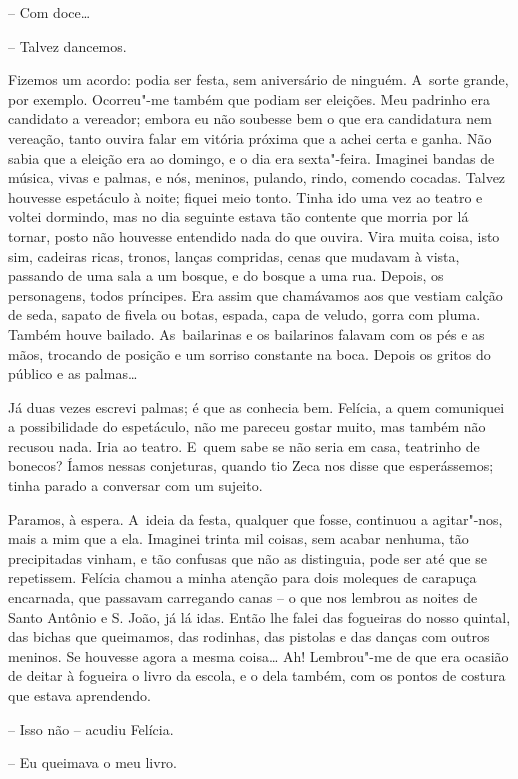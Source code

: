 -- Com doce\ldots{}

-- Talvez dancemos.

Fizemos um acordo: podia ser festa, sem aniversário de ninguém. A~sorte
grande, por exemplo. Ocorreu"-me também que podiam ser eleições. Meu
padrinho era candidato a vereador; embora eu não soubesse bem o que era
candidatura nem vereação, tanto ouvira falar em vitória próxima que a
achei certa e ganha. Não sabia que a eleição era ao domingo, e o dia era
sexta"-feira. Imaginei bandas de música, vivas e palmas, e nós, meninos,
pulando, rindo, comendo cocadas. Talvez houvesse espetáculo à noite;
fiquei meio tonto. Tinha ido uma vez ao teatro e voltei dormindo, mas no
dia seguinte estava tão contente que morria por lá tornar, posto não
houvesse entendido nada do que ouvira. Vira muita coisa, isto sim,
cadeiras ricas, tronos, lanças compridas, cenas que mudavam à vista,
passando de uma sala a um bosque, e do bosque a uma rua. Depois, os
personagens, todos príncipes. Era assim que chamávamos aos que vestiam
calção de seda, sapato de fivela ou botas, espada, capa de veludo, gorra
com pluma. Também houve bailado. As~bailarinas e os bailarinos falavam
com os pés e as mãos, trocando de posição e um sorriso constante na
boca. Depois os gritos do público e as palmas\ldots{}

Já duas vezes escrevi palmas; é que as conhecia bem. Felícia, a quem
comuniquei a possibilidade do espetáculo, não me pareceu gostar muito,
mas também não recusou nada. Iria ao teatro. E~quem sabe se não seria em
casa, teatrinho de bonecos? Íamos nessas conjeturas, quando tio Zeca nos
disse que esperássemos; tinha parado a conversar com um sujeito.

Paramos, à espera. A~ideia da festa, qualquer que fosse, continuou a
agitar"-nos, mais a mim que a ela. Imaginei trinta mil coisas, sem acabar
nenhuma, tão precipitadas vinham, e tão confusas que não as distinguia,
pode ser até que se repetissem. Felícia chamou a minha atenção para dois
moleques de carapuça encarnada, que passavam carregando canas -- o que
nos lembrou as noites de Santo Antônio e S. João, já lá idas. Então lhe
falei das fogueiras do nosso quintal, das bichas que queimamos, das
rodinhas, das pistolas e das danças com outros meninos. Se houvesse
agora a mesma coisa\ldots{} Ah! Lembrou"-me de que era ocasião de deitar à
fogueira o livro da escola, e o dela também, com os pontos de costura
que estava aprendendo.

-- Isso não -- acudiu Felícia.

-- Eu queimava o meu livro.

